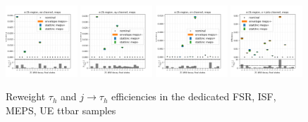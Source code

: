 \begin{figure}
    \includegraphics[width=0.24\textwidth]{chapters/Appendix/sectionTTSyst/figures/afterCorr/icata3_ch0_meps.png}
    \includegraphics[width=0.24\textwidth]{chapters/Appendix/sectionTTSyst/figures/afterCorr/icata3_ch1_meps.png}
    \includegraphics[width=0.24\textwidth]{chapters/Appendix/sectionTTSyst/figures/afterCorr/icata3_ch2_meps.png}
    \includegraphics[width=0.24\textwidth]{chapters/Appendix/sectionTTSyst/figures/afterCorr/icata3_ch3_meps.png}
    
    \caption{Reweight $\tau_h$ and $j \to \tau_h$ efficiencies in the dedicated FSR, ISF, MEPS, UE ttbar samples}
    \label{fig:appendix:reweighttt:effAfterCorrFSR}
\end{figure}



